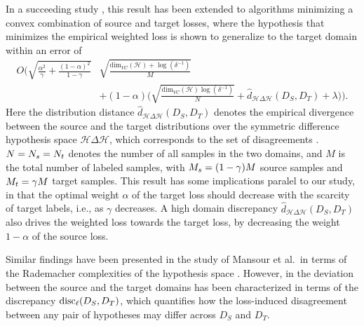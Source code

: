 \documentclass[review,supplement,onefignum,onetabnum]{siamonline250211}
\begin{document}
In a succeeding study \cite{BenDavidBCKPV10}, this result has been extended to algorithms minimizing a convex combination of source and target losses, where the hypothesis that minimizes the empirical weighted loss is shown to generalize to the target domain within an error of 
%
\begin{equation*}
\begin{split}
O\bigg(
\sqrt{\frac{\alpha^2}{\gamma} + \frac{(1-\alpha)^2}{1-\gamma}} 
& \sqrt{  \frac{\text{dim}_{VC}(\mathcal{H}) + \log(\delta^{-1}) }{M} } \\
&+ 
(1-\alpha)
\bigg(\sqrt{\frac{\text{dim}_{VC}(\mathcal{H}) \log(\delta^{-1})}{N} }
+
\hat d_{\mathcal{H}\Delta \mathcal{H}}(D_S, D_T) 
+ \lambda
\bigg)
\bigg).
\end{split}
\end{equation*}
%
Here the distribution distance $\hat d_{\mathcal{H}\Delta \mathcal{H}}(D_S, D_T) $ denotes the  empirical divergence between the source and the target distributions over the symmetric difference hypothesis space $\mathcal{H}\Delta \mathcal{H}$, which corresponds to the set of disagreements \cite{BenDavidBCKPV10}. $N=N_s=N_t$ denotes the number of all samples in the two domains, and $M$ is the total number of labeled samples, with $M_s=(1-\gamma)M$ source samples and $M_t=\gamma M$ target samples. This result has some implications paralel to our study, in that the optimal weight $\alpha$ of the target loss should decrease with the scarcity of target labels, i.e., as $\gamma$ decreases. A high domain discrepancy  $\hat d_{\mathcal{H}\Delta \mathcal{H}}(D_S, D_T) $ also drives the weighted loss towards the target loss, by decreasing the weight $1-\alpha$ of the source loss. 

Similar findings have been presented in the study of Mansour et al.~in terms of the Rademacher complexities of the hypothesis space \cite{MansourMR09}. However, in \cite{MansourMR09} the deviation between the source and the target domains has been characterized in terms of the discrepancy $\text{disc}_{\ell} (D_S, D_T)$, which quantifies how the loss-induced disagreement between any pair of hypotheses may differ across $D_S$ and $D_T$.
\end{document}
